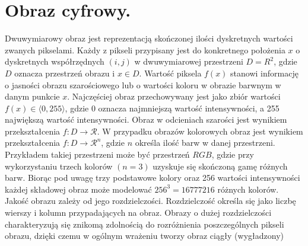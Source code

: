 \documentclass[12pt, twoside, openany]{report}
\theoremstyle{definition}
\begin{document}
\section{Obraz cyfrowy.}
Dwuwymiarowy obraz jest reprezentacją skończonej ilości dyskretnych wartości zwanych pikselami.
Każdy z pikseli przypisany jest do konkretnego położenia $x$ o dyskretnych współrzędnych $(i,j)$ w dwuwymiarowej przestrzeni $D=R^2$, gdzie $D$ oznacza przestrzeń obrazu i $x \in D$.
Wartość piksela $f(x)$ stanowi informację o jasności obrazu szarościowego lub o wartości koloru w obrazie barwnym w danym punkcie $x$. Najczęściej obraz przechowywany jest jako zbiór wartości $f(x) \in \langle 0,255 \rangle$, gdzie 0 oznacza najmniejszą wartość intensywności, a 255 największą wartość intensywności. Obraz w odcieniach szarości jest wynikiem przekształcenia $f: D \rightarrow \mathcal{R}$.
W przypadku obrazów kolorowych obraz jest wynikiem przekształcenia $f: D \rightarrow \mathcal{R}^n$, gdzie $n$ określa ilość barw w danej przestrzeni.
Przykładem takiej przestrzeni może być przestrzeń $RGB$, gdzie przy wykorzystaniu trzech kolorów $(n=3)$ uzyskuje się skończoną gamę różnych barw. Biorąc pod uwagę trzy podstawowe kolory oraz 256 wartości intensywności każdej składowej obraz może modelować $256^3=16777216$ różnych kolorów. Jakość obrazu zależy od jego rozdzielczości. Rozdzielczość określa się jako liczbę wierszy i kolumn przypadających na obraz. Obrazy o dużej rozdzielczości charakteryzują się znikomą zdolnością do rozróżnienia poszczególnych pikseli obrazu, dzięki czemu w ogólnym wrażeniu tworzy obraz ciągły (wygładzony)
\end{document}
